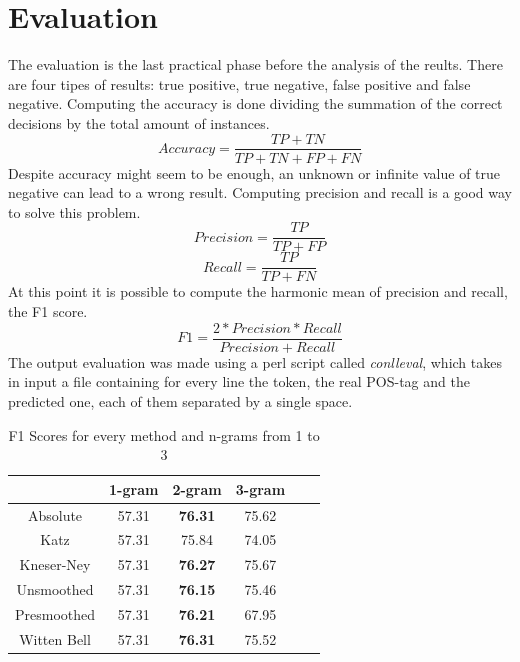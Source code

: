 \documentclass[11pt,a4paper]{article}
\begin{document}
\section{Evaluation}%
The evaluation is the last practical phase before the analysis of the reults. There are four tipes of results: true positive, true negative, false positive and false negative. Computing the accuracy is done dividing the summation of the correct decisions by the total amount of instances.
\begin{equation}
Accuracy= \frac{TP + TN} {TP + TN + FP + FN}
\end{equation}
Despite accuracy might seem to be enough, an unknown or infinite value of true negative can lead to a wrong result. Computing precision and recall is a good way to solve this problem.
\begin{equation}
Precision = \frac{TP} {TP + FP}
\end{equation}
\begin{equation}
Recall = \frac{TP}{TP + FN}
\end{equation}
 At this point it is possible to compute the harmonic mean of precision and recall, the F1 score.
 \begin{equation}
F1 =  \frac{2 * Precision * Recall}{Precision + Recall} 
\end{equation}
The output evaluation was made using a perl script called \textit{conlleval}, which takes in input a file containing for every line the token, the real POS-tag and the predicted one, each of them separated by a single space.



\begin{table}[t!]
\begin{center}
\begin{tabular}{|c|c|c|c|c|c|}
\hline
 & 1-gram & 2-gram & 3-gram \\ \hline
Absolute & 57.31 & \textbf{76.31} & 75.62  \\ \hline
Katz & 57.31 & 75.84 & 74.05 \\ \hline
Kneser-Ney & 57.31 & \textbf{76.27} & 75.67 \\ \hline
Unsmoothed & 57.31 & \textbf{76.15} & 75.46 \\ \hline
Presmoothed & 57.31 & \textbf{76.21} & 67.95 \\ \hline
Witten Bell & 57.31 & \textbf{76.31} & 75.52 \\ \hline
\end{tabular}
\caption{F1 Scores for every method and n-grams from 1 to 3}
\label{f1-scores1}
\end{center}
\end{table}
\end{document}
